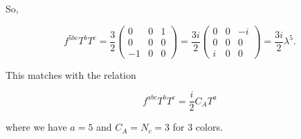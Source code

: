 So,

\begin{equation}
  f^{5bc}T^bT^c = \frac{3}{2}\begin{pmatrix}0 & 0 & 1 \\ 0 & 0 & 0 \\ -1 & 0 & 0\end{pmatrix} = \frac{3i}{2}\begin{pmatrix}0 & 0 & -i \\ 0 & 0 & 0 \\ i & 0 & 0\end{pmatrix} = \frac{3i}{2}\lambda^5.
\end{equation}

This matches with the relation

\begin{equation}
  f^{abc}T^bT^c = \frac{i}{2}C_AT^a
\end{equation}

where we have $a=5$ and $C_A = N_c = 3$ for 3 colors.


